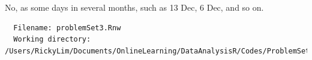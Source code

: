 \documentclass{article}\usepackage[]{graphicx}\usepackage[]{color}
\begin{document}
\begin{figure}[!hbt]
    \centering
\end{figure}
\clearpage
No, as some days in several months, such as 13 Dec, 6 Dec, and so on.

\begin{verbatim}
  Filename: problemSet3.Rnw 
  Working directory: /Users/RickyLim/Documents/OnlineLearning/DataAnalysisR/Codes/ProblemSet3 
\end{verbatim}
\end{document}
